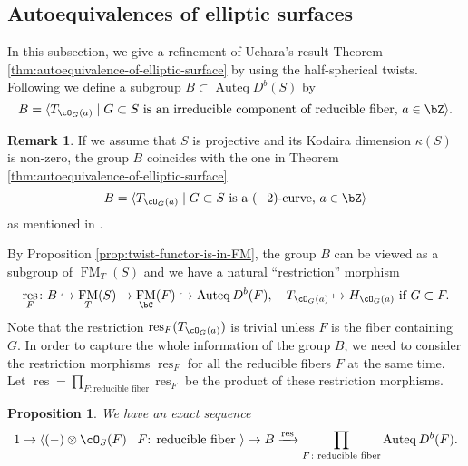 \documentclass{amsart}
\numberwithin{equation}{section}
\theoremstyle{plain}
\newtheorem{proposition}[theorem]{Proposition}
\theoremstyle{definition}
\newtheorem{remark}[theorem]{Remark}
\DeclareMathOperator{\Auteq}{\mathrm{Auteq}}
\DeclareMathOperator{\FM}{\mathrm{FM}}
\DeclareMathOperator{\res}{\mathrm{res}}
\begin{document}
\subsection{Autoequivalences of elliptic surfaces}
In this subsection, we give a refinement of Uehara's result Theorem \ref{thm:autoequivalence-of-elliptic-surface} by using the half-spherical twists.
Following \cite{MR3568337} we define a subgroup $B \subset \Auteq D^b(S)$ by
\begin{equation}
    B = \langle T_{\cO_G(a)} \mid G \subset S \text{ is an irreducible component of reducible fiber, } a \in \bZ\rangle.
\end{equation}


\begin{remark}\label{rem:alternative-description-of-minus-two-curves}
    If we assume that $S$ is projective and its Kodaira dimension $\kappa(S)$ is non-zero, the group $B$ coincides with the one in Theorem \ref{thm:autoequivalence-of-elliptic-surface}
    \begin{equation}
        B = \langle T_{\cO_G(a)} \mid G \subset S \text{ is a $(-2)$-curve, } a \in \bZ\rangle
    \end{equation}
    as mentioned in \cite[Section 3]{MR3568337}.
\end{remark}
By Proposition \ref{prop:twist-functor-is-in-FM}, the group $B$ can be viewed as a subgroup of $\FM_T(S)$ and we have a natural ``restriction'' morphism
\begin{equation}
    \res_F \colon B \hookrightarrow \FM_T(S) \to \FM_{\bC}(F) \hookrightarrow \Auteq D^b(F), \quad T_{\cO_G(a)} \mapsto H_{\cO_G(a)} \text{ if } G \subset F.
\end{equation}
Note that the restriction $\res_F(T_{\cO_G(a)})$ is trivial unless $F$ is the fiber containing $G$.
In order to capture the whole information of the group $B$, we need to consider the restriction morphisms $\res_F$ for all the reducible fibers $F$ at the same time.
Let $\res = \prod_{F \colon \text{reducible fiber}} \res_F$ be the product of these restriction morphisms.
\begin{proposition}\label{prop:kernel-of-res}
    We have an exact sequence
    \begin{equation}
        1 \to \langle (-) \otimes \cO_S(F) \mid F \text{: reducible fiber }\rangle \to B \xrightarrow{\res} \prod_{F \colon \text{reducible fiber}} \Auteq D^b(F).
    \end{equation}
\end{proposition}
\end{document}
